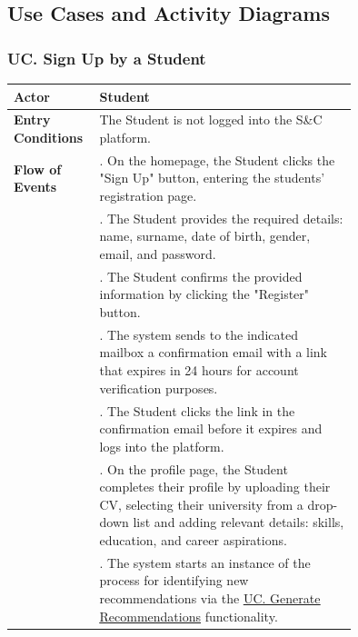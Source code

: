 \newpage
\subsection{Use Cases and Activity Diagrams}
\label{subsec: use_cases}%

\setcounter{ucsteps}{1}
\newcommand{\cucsteps}{\theucsteps\stepcounter{ucsteps}}
\newcommand{\resetucsteps}{\setcounter{ucsteps}{1}}

\setcounter{uc}{1}
\newcommand{\cuc}{\theuc{}\resetucsteps}

\subsubsection*{UC\cuc . Sign Up by a Student}
\begin{center}
    \begin{longtable}{|l|p{0.75\linewidth}|}
        \hline
        \textbf{Actor}            & Student\\
        \hline
        \textbf{Entry Conditions} & The Student is not logged into the S\&C platform. \\
        \hline
        \textbf{Flow of Events}    
        & \cucsteps. On the homepage, the Student clicks the "Sign Up" button, entering the students' registration page. \\
        & \cucsteps. The Student provides the required details: name, surname, date of birth, gender, email, and password. \\
        & \cucsteps. The Student confirms the provided information by clicking the "Register" button. \\
        & \cucsteps. The system sends to the indicated mailbox a confirmation email with a link that expires in 24 hours for account verification purposes. \\
        & \cucsteps. The Student clicks the link in the confirmation email before it expires and logs into the platform. \\
        & \cucsteps. On the profile page, the Student completes their profile by uploading their CV, selecting their university from a drop-down list and adding relevant details: skills, education, and career aspirations. \\
        & \cucsteps. The system starts an instance of the process for identifying new recommendations via the \hyperref[subsec: generate_recommendations_uc]{\uline{UC. Generate Recommendations}} functionality. \\

\end{longtable}
\end{center}
